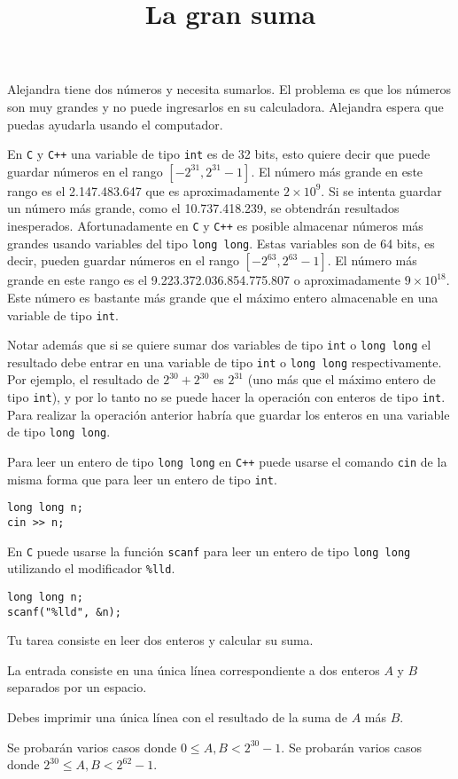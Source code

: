\documentclass{oci}
\title{La gran suma}
\newcommand{\C}{\texttt{C}\xspace}
\newcommand{\Cpp}{\texttt{C++}\xspace}
\newcommand{\Int}{\texttt{int}\xspace}
\newcommand{\Long}{\texttt{long long}\xspace}
\newcommand{\cin}{\texttt{cin}\xspace}
\newcommand{\scanf}{\texttt{scanf}\xspace}
\begin{document}
\begin{problemDescription}
  Alejandra tiene dos números y necesita sumarlos.
El problema es que los números son muy grandes y no puede ingresarlos en su calculadora.
Alejandra espera que puedas ayudarla usando el computador.

En \C y \Cpp una variable de tipo \Int es de 32 bits, esto quiere decir que puede guardar números en el rango $[-2^{31}, 2^{31}-1]$.
El número más grande en este rango es el 2.147.483.647 que es aproximadamente $2\times 10^9$.
Si se intenta guardar un número más grande, como el 10.737.418.239, se obtendrán resultados inesperados.
Afortunadamente en \C y \Cpp es posible almacenar números más grandes usando variables del tipo \Long.
Estas variables son de 64 bits, es decir, pueden guardar números en el rango $[-2^{63}, 2^{63}-1]$.
El número más grande en este rango es el 9.223.372.036.854.775.807 o aproximadamente $9\times 10^{18}$.
Este número es bastante más grande que el máximo entero almacenable en una variable de tipo \Int.

Notar además que si se quiere sumar dos variables de tipo \Int o \Long el resultado debe entrar en una variable de tipo \Int o \Long respectivamente.
Por ejemplo, el resultado de $2^{30}+2^{30}$ es $2^{31}$ (uno más que el máximo entero de tipo \Int), y por lo tanto no se puede hacer la operación con enteros de tipo \Int.
Para realizar la operación anterior habría que guardar los enteros en una variable de tipo \Long.

Para leer un entero de tipo \Long en \Cpp puede usarse el comando \cin de la misma forma que para leer un entero de tipo \Int.
\begin{verbatim}
long long n;
cin >> n;
\end{verbatim}

En \C puede usarse la función \scanf para leer un entero de tipo \Long utilizando el modificador \texttt{\%lld}.
\begin{verbatim}
long long n;
scanf("%lld", &n);
\end{verbatim}

Tu tarea consiste en leer dos enteros y calcular su suma.
  
\end{problemDescription}

\begin{inputDescription}
  La entrada consiste en una única línea correspondiente a dos enteros $A$ y $B$ separados por un espacio.
\end{inputDescription}

\begin{outputDescription}
  Debes imprimir una única línea con el resultado de la suma de $A$ más $B$.
\end{outputDescription}

\begin{scoreDescription}
   Se probarán varios casos donde $0\leq A,B < 2^{30}-1$.
   Se probarán varios casos donde $2^{30}\leq A,B < 2^{62}-1$.
\end{scoreDescription}

\begin{sampleDescription}
\end{sampleDescription}
\end{document}
